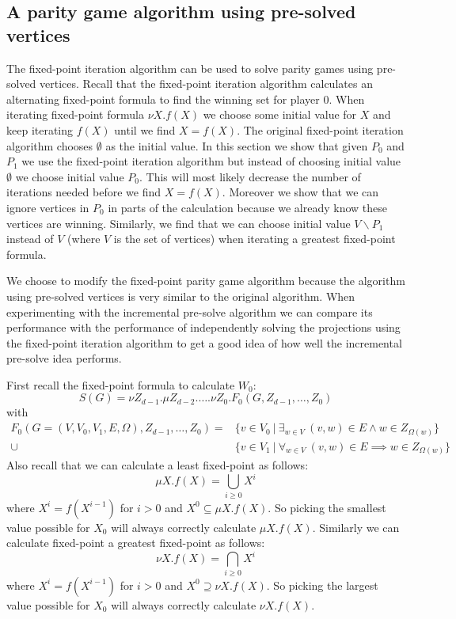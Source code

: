 \subsection{A parity game algorithm using pre-solved vertices}
The fixed-point iteration algorithm can be used to solve parity games using pre-solved vertices. Recall that the fixed-point iteration algorithm calculates an alternating fixed-point formula to find the winning set for player 0. When iterating fixed-point formula $\nu X.f(X)$ we choose some initial value for $X$ and keep iterating $f(X)$ until we find $X = f(X)$. The original fixed-point iteration algorithm chooses $\emptyset$ as the initial value. In this section we show that given $P_0$ and $P_1$ we use the fixed-point iteration algorithm but instead of choosing initial value $\emptyset$ we choose initial value $P_0$. This will most likely decrease the number of iterations needed before we find $X = f(X)$. Moreover we show that we can ignore vertices in $P_0$ in parts of the calculation because we already know these vertices are winning. Similarly, we find that we can choose initial value $V\backslash P_1$ instead of $V$ (where $V$ is the set of vertices) when iterating a greatest fixed-point formula. 

We choose to modify the fixed-point parity game algorithm because the algorithm using pre-solved vertices is very similar to the original algorithm. When experimenting with the incremental pre-solve algorithm we can compare its performance with the performance of independently solving the projections using the fixed-point iteration algorithm to get a good idea of how well the incremental pre-solve idea performs.

First recall the fixed-point formula to calculate $W_0$:
\[ S(G) = \nu Z_{d-1}. \mu Z_{d-2}. \dots . \nu Z_0. F_0(G,Z_{d-1},\dots,Z_0) \]
with
\begin{align*}
	F_0(G = (V,V_0,V_1,E,\Omega),Z_{d-1},\dots,Z_0) = &\{ v \in V_0\ |\ \exists_{w\in V}\ (v,w) \in E \wedge w\in Z_{\Omega(w)} \}\\
	\cup &\{ v \in V_1\ |\ \forall_{w\in V}\ (v,w) \in E \implies w\in Z_{\Omega(w)} \}
\end{align*}
Also recall that we can calculate a least fixed-point as follows:
\[ \mu X.f(X) = \bigcup_{i \geq 0} X^i \]
where $X^i = f(X^{i-1})$ for $i > 0$ and $X^0 \subseteq \mu X.f(X)$. So picking the smallest value possible for $X_0$ will always correctly calculate $\mu X. f(X)$.
Similarly we can calculate fixed-point a greatest fixed-point as follows:
\[ \nu X.f(X) = \bigcap_{i \geq 0} X^i \]
where $X^i = f(X^{i-1})$ for $i > 0$ and $X^0 \supseteq \nu X.f(X)$. So picking the largest value possible for $X_0$ will always correctly calculate $\nu X. f(X)$.

